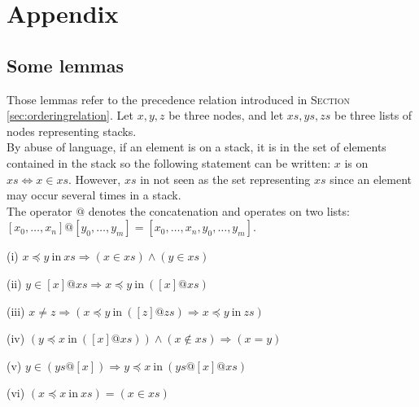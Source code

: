\documentclass[a4 paper, 12pt]{article}
\begin{document}
{\pagebreak

\section{Appendix}\label{appendix}
\subsection{Some lemmas}
Those lemmas refer to the precedence relation introduced in \textsc{Section} \ref{sec:orderingrelation}.
\BlankLine
Let $x, y, z$ be three nodes, and let $xs, ys, zs$ be three lists of nodes representing stacks.\\
By abuse of language, if an element is on a stack, it is in the set of elements contained in the stack so the following statement can be written: $x$ is on $xs \Longleftrightarrow x \in xs$. However, $xs$ in not seen as the set representing $xs$ since an element may occur several times in a stack.\\
The operator $@$ denotes the concatenation and operates on two lists: $[x_0, \dots, x_n] @ [y_0, \dots, y_m] = [x_0, \dots, x_n, y_0, \dots, y_m]$.\\

\begin{flushleft}
    (i)
$x \preceq y~\text{in}~xs \Longrightarrow (x \in xs)\wedge(y \in xs)$
\end{flushleft}
\begin{flushleft}
    (ii)
$y \in [x] @ xs \Longrightarrow x \preceq y~\text{in}~([x] @ xs)$
\end{flushleft}

\begin{flushleft}
    (iii)
    $x \neq z \Longrightarrow (x \preceq y~\text{in}~([z] @ zs) \Longrightarrow x \preceq y ~\text{in}~zs)$
\end{flushleft}

\begin{flushleft}
    (iv)
    $(y \preceq x~\text{in}~([x] @ xs)) \wedge (x \notin xs) \Longrightarrow (x = y)$
\end{flushleft}

\begin{flushleft}
    (v)
    $y \in (ys @ [x]) \Longrightarrow y \preceq x~\text{in}~(ys @ [x] @ xs)$
\end{flushleft} 

\begin{flushleft}
    (vi)
    $(x \preceq x~\text{in}~xs) = (x \in xs)$
\end{flushleft}

}
\end{document}
